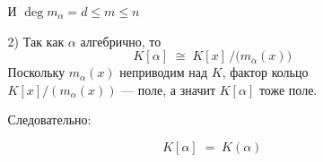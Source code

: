 \documentclass[a4paper]{article}
\begin{document}
\begin{enumerate}
\begin{enumerate}
    И $\deg m_\alpha = d\le m \le n$\\

    \item[2)]Так как $\alpha$ алгебрично, то
    $$
    K[\alpha] \;\cong\; K[x]\,/\bigl(m_\alpha(x)\bigr)
    $$
    Поскольку $m_\alpha(x)$ неприводим над $K$, фактор кольцо
    $K[x]/(m_\alpha(x))$ --- поле, а значит $K[\alpha]$ тоже поле.
    
    Следовательно:

    $$
    K[\alpha] \;=\; K(\alpha)
    $$


  \end{enumerate}
  \end{enumerate}
\end{document}
